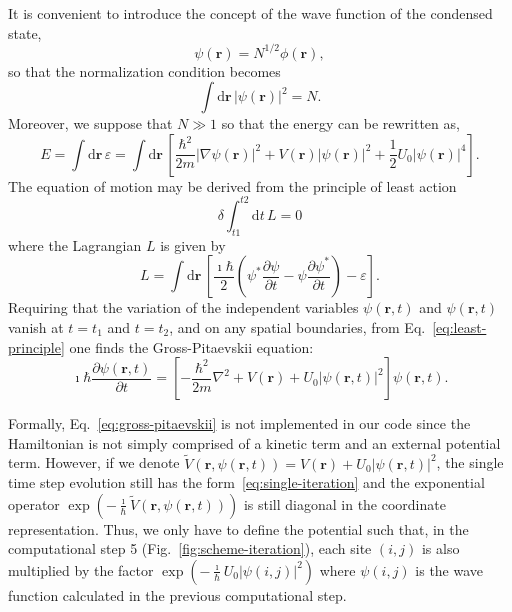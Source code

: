 It is convenient to introduce the concept of the wave function of the condensed state,
\begin{equation}
\psi(\textbf{r}) = N^{1/2} \phi(\textbf{r}),
\end{equation}
so that the normalization condition becomes
\begin{equation}
\int \mathrm{d}\textbf{r} \, |\psi(\textbf{r})|^2 = N.
\end{equation}
Moreover, we suppose that $N \gg 1$ so that the energy can be rewritten as,
\begin{equation}
E = \int \mathrm{d} \textbf{r} \, \varepsilon  = \int \mathrm{d} \textbf{r} \, \left[ \frac{\hbar^2}{2m} |\nabla \psi(\textbf{r}) |^2 + V(\textbf{r}) |\psi(\textbf{r})|^2 + \frac{1}{2} U_0 |\psi(\textbf{r})|^4 \right].
\end{equation}
The equation of motion may be derived from the principle of least action 
\begin{equation}
\delta \int_{t1}^{t2} \mathrm{d} t \, L = 0 \label{eq:least-principle}
\end{equation}
where the Lagrangian $L$ is given by
\begin{equation}
L = \int \mathrm{d} \textbf{r} \, \left[ \frac{\imath \hbar}{2} \left( \psi^\ast \frac{\partial \psi}{\partial t} - \psi \frac{\partial \psi^\ast}{\partial t} \right) - \varepsilon \right].
\end{equation}
Requiring that the variation of the independent variables $\psi(\textbf{r},t)$ and $\psi(\textbf{r},t)$ vanish at $t=t_1$ and $t=t_2$, and on any spatial boundaries, from Eq.~\eqref{eq:least-principle} one finds the Gross-Pitaevskii equation:
\begin{equation} \label{eq:gross-pitaevskii}
\imath \hbar \frac{\partial \psi(\textbf{r}, t)}{\partial t} = \left[ - \frac{\hbar^2}{2m} \nabla^2 + V(\textbf{r}) + U_0 |\psi(\textbf{r}, t)|^2 \right] \psi(\textbf{r}, t).
\end{equation}

Formally, Eq.~\eqref{eq:gross-pitaevskii} is not implemented in our code since the Hamiltonian is not simply comprised of a kinetic term and an external potential term. However, if we denote $\tilde{V}(\textbf{r}, \psi(\textbf{r}, t)) = V(\textbf{r}) + U_0 |\psi(\textbf{r}, t)|^2$, the single time step evolution still has the form~\eqref{eq:single-iteration} and the exponential operator $\exp \left( - \frac{\imath}{\hbar} \tilde{V}(\textbf{r}, \psi(\textbf{r}, t)) \right)$ is still diagonal in the coordinate representation. Thus, we only have to define the potential such that, in the computational step 5 (Fig.~\ref{fig:scheme-iteration}), each site $(i,j)$ is also multiplied by the factor $\exp(-\frac{\imath}{\hbar} U_0 |\psi(i,j)|^2)$ where $\psi(i,j)$ is the wave function calculated in the previous computational step.

